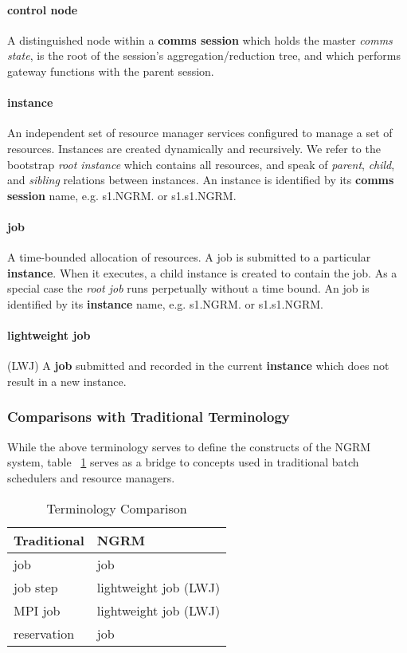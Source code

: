 \documentclass{article}
\newcommand{\ngrm}{NGRM}
\begin{document}
\paragraph{control node}
A distinguished node within a {\bf comms session} which holds the master
{\em comms state}, is the root of the session's aggregation/reduction tree,
and which performs gateway functions with the parent session.

\paragraph{instance}
An independent set of resource manager services configured to manage
a set of resources.
Instances are created dynamically and recursively.
We refer to the bootstrap {\em root instance} which contains all resources,
and speak of {\em parent}, {\em child}, and {\em sibling} relations between
instances.
An instance is identified by its {\bf comms session} name,
e.g. s1.\ngrm.  or s1.s1.\ngrm.

\paragraph{job}
A time-bounded allocation of resources.  A job is submitted to a
particular {\bf instance}.  When it executes, a child instance is
created to contain the job.  As a special case the {\em root job} 
runs perpetually without a time bound.
An job is identified by its {\bf instance} name,
e.g. s1.\ngrm.  or s1.s1.\ngrm.

\paragraph{lightweight job} (LWJ) 
A {\bf job} submitted and recorded in the current {\bf instance}
which does not result in a new instance.

\subsubsection{Comparisons with Traditional Terminology}

While the above terminology serves to define the constructs of the
NGRM system, table ~\ref{tab:tradterms} serves as a bridge to concepts
used in traditional batch schedulers and resource managers.

\begin{table}
\caption{Terminology Comparison}
\centering
\begin{tabular}{|l|l|}
\hline
Traditional & NGRM \\
\hline
job & job \\
job step & lightweight job (LWJ) \\
MPI job & lightweight job (LWJ) \\
reservation & job \\
\hline
\end{tabular}
\label{tab:tradterms}
\end{table}
\end{document}

